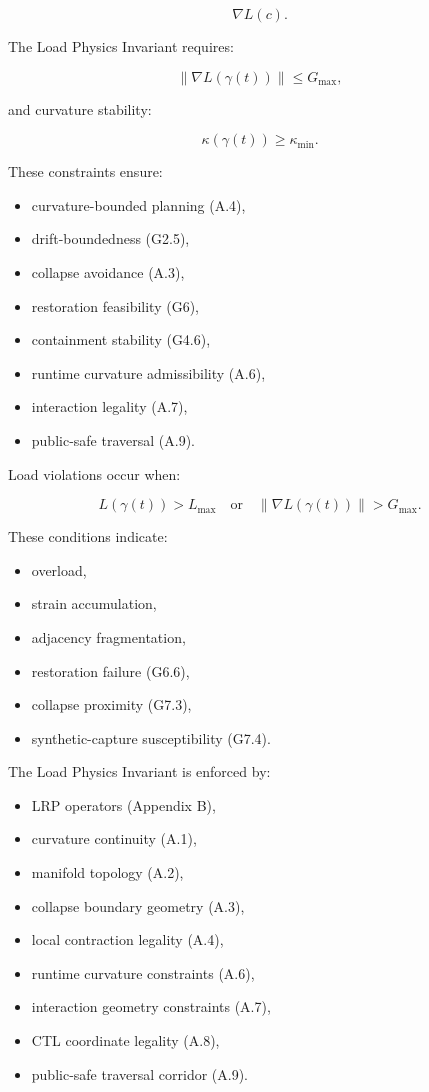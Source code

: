 \[
\nabla L(c).
\]



The Load Physics Invariant requires:


\[
\|\nabla L(\gamma(t))\| \le G_{\max},
\]


and curvature stability:


\[
\kappa(\gamma(t)) \ge \kappa_{\min}.
\]



\medskip

\noindent These constraints ensure:
\begin{itemize}
    \item curvature-bounded planning (A.4),
    \item drift-boundedness (G2.5),
    \item collapse avoidance (A.3),
    \item restoration feasibility (G6),
    \item containment stability (G4.6),
    \item runtime curvature admissibility (A.6),
    \item interaction legality (A.7),
    \item public-safe traversal (A.9).
\end{itemize}

\medskip

\noindent Load violations occur when:


\[
L(\gamma(t)) > L_{\max}
\quad \text{or} \quad
\|\nabla L(\gamma(t))\| > G_{\max}.
\]



These conditions indicate:
\begin{itemize}
    \item overload,
    \item strain accumulation,
    \item adjacency fragmentation,
    \item restoration failure (G6.6),
    \item collapse proximity (G7.3),
    \item synthetic-capture susceptibility (G7.4).
\end{itemize}

\medskip

\noindent The Load Physics Invariant is enforced by:
\begin{itemize}
    \item LRP operators (Appendix B),
    \item curvature continuity (A.1),
    \item manifold topology (A.2),
    \item collapse boundary geometry (A.3),
    \item local contraction legality (A.4),
    \item runtime curvature constraints (A.6),
    \item interaction geometry constraints (A.7),
    \item CTL coordinate legality (A.8),
    \item public-safe traversal corridor (A.9).
\end{itemize}

